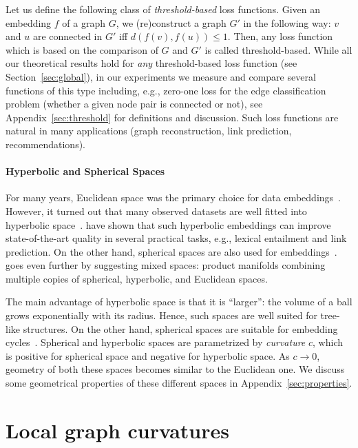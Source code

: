 \documentclass{article} %
\begin{document}
Let us define the following class of \textit{threshold-based} loss functions. Given an embedding $f$ of a graph $G$, we (re)construct a graph $G'$ in the following way: $v$ and $u$ are connected in $G'$ iff $d(f(v),f(u))\le 1$. Then, any loss function which is based on the comparison of $G$ and $G'$ is called threshold-based. While all our theoretical results hold for \textit{any} threshold-based loss function (see Section~\ref{sec:global}), in our experiments we measure and compare several functions of this type including, e.g., zero-one loss for the edge classification problem (whether a given node pair is connected or not), see Appendix~\ref{sec:threshold} for definitions and discussion. Such loss functions are natural in many applications (graph reconstruction, link prediction, recommendations).

\paragraph{Hyperbolic and Spherical Spaces}

For many years, Euclidean space was the primary choice for data embeddings~\citep{goyal2018graph}. However, it turned out that many observed datasets are well fitted into hyperbolic space~\citep{krioukov2010hyperbolic}. \citet{nickel2017poincare} have shown that such hyperbolic embeddings can improve state-of-the-art quality in several practical tasks, e.g., lexical entailment and link prediction. On the other hand, spherical spaces are also used for embeddings~\citep{liu2017sphereface}. \citet{gu2019learning} goes even further by suggesting mixed spaces: product manifolds combining multiple copies of spherical, hyperbolic, and Euclidean spaces. 

The main advantage of hyperbolic space is that it is ``larger'': the volume of a ball grows exponentially with its radius. Hence, such spaces are well suited for tree-like structures. On the other hand, spherical spaces are suitable for embedding cycles~\citep{gu2019learning}. Spherical and hyperbolic spaces are parametrized by \textit{curvature} $c$, which is positive for spherical space and negative for hyperbolic space. As $c \to 0$, geometry of both these spaces becomes similar to the Euclidean one. We discuss some geometrical properties of these different spaces in Appendix~\ref{sec:properties}.


\section{Local graph curvatures}
\end{document}
